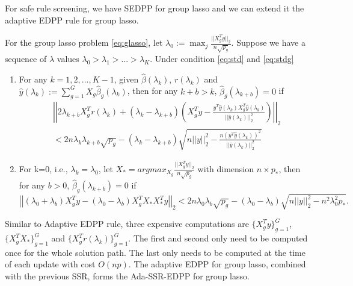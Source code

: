 For safe rule screening, we have SEDPP for group lasso\citep{wang2013lasso} and we can extend it the adaptive EDPP rule for group lasso.

\begin{theorem}
For the group lasso problem \eqref{eq:glasso}, let $\lambda_0:=\max_j\frac{||X_g^Ty||_2}{n\sqrt{p_g}}$. Suppose we have a sequence of $\lambda$ values $\lambda_0>\lambda_1>...>\lambda_K$. Under condition \eqref{eq:std} and \eqref{eq:stdg}
    \begin{enumerate}
        \item For any $k=1,2,...,K-1$, given $\hat{\beta}(\lambda_k)$, $r(\lambda_k)$ and $\hat{y}(\lambda_k):=\sum_{g=1}^GX_g\hat{\beta}_g(\lambda_k)$, then for any  $k+b>k$, $\hat{\beta}_g(\lambda_{k+b})=0$ if
        \begin{equation}
            \begin{split}
                &\left|\left|2\lambda_{k+b}X_g^Tr(\lambda_k)+(\lambda_k-\lambda_{k+b})\left( X_g^Ty-\frac{y^T\hat{y}(\lambda_k)X_g^T\hat{y}(\lambda_k)}{||\hat{y}(\lambda_k)||_2^2}\right)\right|\right|_2\\
                &<2n\lambda_k\lambda_{k+b}\sqrt{p_g}-(\lambda_k-\lambda_{k+b})\sqrt{n||y||_2^2-\frac{n(y^T\hat{y}(\lambda_k))^2}{||\hat{y}(\lambda_k)||_2^2}}
            \end{split}
        \end{equation}
        \item For k=0, i.e., $\lambda_k=\lambda_0$, let $X_*=argmax_{X_g}\frac{||X_g^Ty||_2}{n\sqrt{p_g}}$ with dimension $n\times p_*$, then for any $b>0$, $\hat{\beta}_g(\lambda_{k+b})=0$ if
        \begin{equation}
        \left|\left|(\lambda_0+\lambda_b)X_g^Ty-(\lambda_0-\lambda_b)X_g^TX_*X_*^Ty\right|\right|_2<2n\lambda_0\lambda_b\sqrt{p_g}-(\lambda_0-\lambda_b)\sqrt{n||y||_2^2-n^2\lambda_0^2p_*}.
    \end{equation}
    \end{enumerate}
\end{theorem}

Similar to Adaptive EDPP rule, three expensive computations are $\{X_g^Ty\}_{g=1}^G$, $\{X_g^TX_*\}_{g=1}^G$ and $\{X_g^Tr(\lambda_k)\}_{g=1}^G$. The first and second only need to be computed once for the whole solution path. The last only needs to be computed at the time of each update with cost $O(np)$. The adaptive EDPP for group lasso, combined with the previous SSR, forms the Ada-SSR-EDPP for group lasso.

